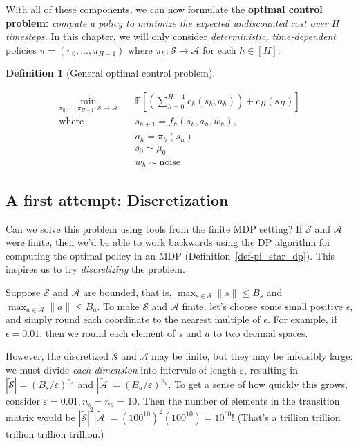 \documentclass[
  letterpaper,
  DIV=11,
  numbers=noendperiod]{scrreprt}
\theoremstyle{plain}
\theoremstyle{plain}
\theoremstyle{definition}
\theoremstyle{definition}
\newtheorem{definition}{Definition}[chapter]
\theoremstyle{remark}
\begin{document}
With all of these components, we can now formulate the \textbf{optimal
control problem:} \emph{compute a policy to minimize the expected
undiscounted cost over \(H\) timesteps.} In this chapter, we will only
consider \emph{deterministic, time-dependent} policies
\(\pi = (\pi_0, \dots, \pi_{H-1})\) where
\(\pi_h : \mathcal{S} \to \mathcal{A}\) for each \(h\in [H]\).

\begin{definition}[General optimal control
problem]\protect\hypertarget{def-optimal_control}{}\label{def-optimal_control}

\[
\begin{split}
    \min_{\pi_0, \dots, \pi_{H-1} : \mathcal{S} \to \mathcal{A}} \quad & \mathbb{E}\left[
        \left( \sum_{h=0}^{H-1} c_h(s_h, a_h) \right) + c_H(s_H)
        \right] \\
    \text{where} \quad & s_{h+1} = f_h(s_h, a_h, w_h), \\
    & a_h= \pi_h(s_h) \\
    & s_0 \sim \mu_0 \\
    & w_h\sim \text{noise}
\end{split}
\]

\end{definition}

\subsection{A first attempt:
Discretization}\label{a-first-attempt-discretization}

Can we solve this problem using tools from the finite MDP setting? If
\(\mathcal{S}\) and \(\mathcal{A}\) were finite, then we'd be able to
work backwards using the DP algorithm for computing the optimal policy
in an MDP (Definition~\ref{def-pi_star_dp}). This inspires us to try
\emph{discretizing} the problem.

Suppose \(\mathcal{S}\) and \(\mathcal{A}\) are bounded, that is,
\(\max_{s\in \mathcal{S}} \|s\| \le B_s\) and
\(\max_{a\in \mathcal{A}} \|a\| \le B_a\). To make \(\mathcal{S}\) and
\(\mathcal{A}\) finite, let's choose some small positive \(\epsilon\),
and simply round each coordinate to the nearest multiple of
\(\epsilon\). For example, if \(\epsilon = 0.01\), then we round each
element of \(s\) and \(a\) to two decimal spaces.

However, the discretized \(\widetilde{\mathcal{S}}\) and
\(\widetilde{\mathcal{A}}\) may be finite, but they may be infeasibly
large: we must divide \emph{each dimension} into intervals of length
\(\varepsilon\), resulting in
\(|\widetilde{\mathcal{S}}| = (B_s/\varepsilon)^{n_s}\) and
\(|\widetilde{\mathcal{A}}| = (B_a/\varepsilon)^{n_a}\). To get a sense
of how quickly this grows, consider
\(\varepsilon = 0.01, n_s= n_a= 10\). Then the number of elements in the
transition matrix would be
\(|\widetilde{\mathcal{S}}|^2 |\widetilde{\mathcal{A}}| = (100^{10})^2 (100^{10}) = 10^{60}\)!
(That's a trillion trillion trillion trillion trillion.)
\end{document}
